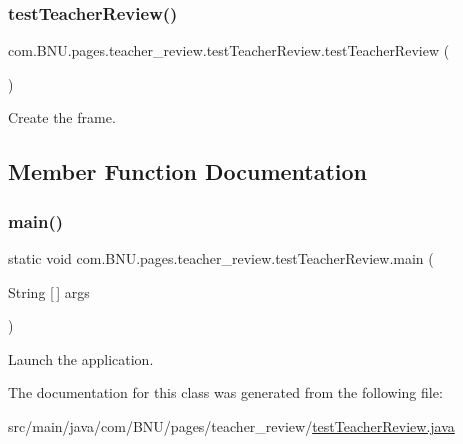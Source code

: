 \subsubsection{\texorpdfstring{test\+Teacher\+Review()}{testTeacherReview()}}
{\footnotesize\ttfamily com.\+B\+N\+U.\+pages.\+teacher\+\_\+review.\+test\+Teacher\+Review.\+test\+Teacher\+Review (\begin{DoxyParamCaption}{ }\end{DoxyParamCaption})}

Create the frame. 

\subsection{Member Function Documentation}
\mbox{\label{classcom_1_1_b_n_u_1_1pages_1_1teacher__review_1_1test_teacher_review_aecd53fbb6705fba02fd94f05b0813f47}} 
\subsubsection{\texorpdfstring{main()}{main()}}
{\footnotesize\ttfamily static void com.\+B\+N\+U.\+pages.\+teacher\+\_\+review.\+test\+Teacher\+Review.\+main (\begin{DoxyParamCaption}\item[{String \mbox{[}$\,$\mbox{]}}]{args }\end{DoxyParamCaption})\hspace{0.3cm}{\ttfamily [static]}}

Launch the application. 

The documentation for this class was generated from the following file\+:\begin{DoxyCompactItemize}
\item 
src/main/java/com/\+B\+N\+U/pages/teacher\+\_\+review/\mbox{\hyperlink{test_teacher_review_8java}{test\+Teacher\+Review.\+java}}\end{DoxyCompactItemize}
